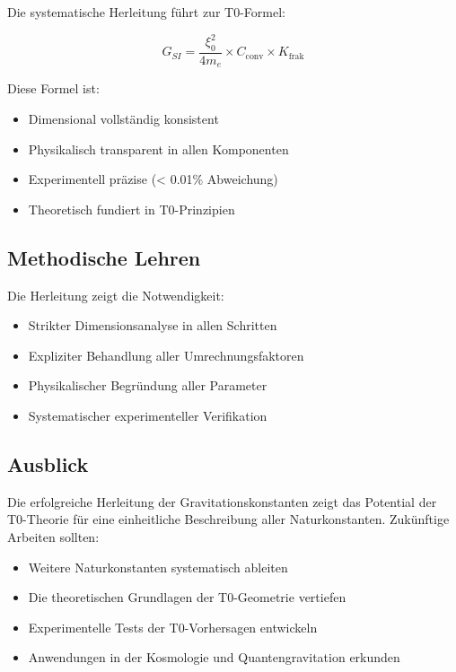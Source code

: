 \documentclass[12pt,a4paper]{article}
\newcommand{\Kfrak}{K_{\text{frak}}}
\newcommand{\Cconv}{C_{\text{conv}}}
\begin{document}
	Die systematische Herleitung führt zur T0-Formel:
	
	\begin{equation}
		\boxed{G_{SI} = \frac{\xi_0^2}{4 m_e} \times \Cconv \times \Kfrak}
	\end{equation}
	
	Diese Formel ist:
	\begin{itemize}
		\item Dimensional vollständig konsistent
		\item Physikalisch transparent in allen Komponenten
		\item Experimentell präzise (< 0.01\% Abweichung)
		\item Theoretisch fundiert in T0-Prinzipien
	\end{itemize}
	
	\subsection{Methodische Lehren}
	
	Die Herleitung zeigt die Notwendigkeit:
	\begin{itemize}
		\item Strikter Dimensionsanalyse in allen Schritten
		\item Expliziter Behandlung aller Umrechnungsfaktoren
		\item Physikalischer Begründung aller Parameter
		\item Systematischer experimenteller Verifikation
	\end{itemize}
	
	\subsection{Ausblick}
	
	Die erfolgreiche Herleitung der Gravitationskonstanten zeigt das Potential der T0-Theorie für eine einheitliche Beschreibung aller Naturkonstanten. Zukünftige Arbeiten sollten:
	
	\begin{itemize}
		\item Weitere Naturkonstanten systematisch ableiten
		\item Die theoretischen Grundlagen der T0-Geometrie vertiefen
		\item Experimentelle Tests der T0-Vorhersagen entwickeln
		\item Anwendungen in der Kosmologie und Quantengravitation erkunden
	\end{itemize}
	
\end{document}
